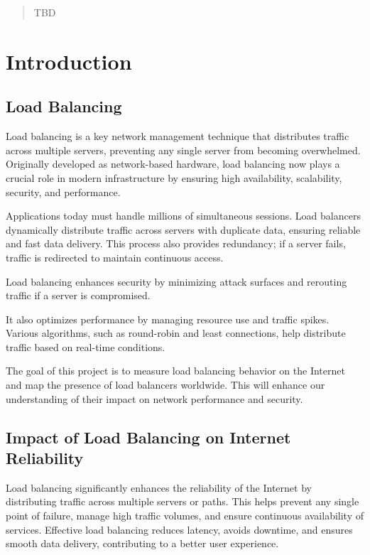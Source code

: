 \documentclass[12pt]{cwru_thesis}
\begin{document}
\printnomenclature

\begin{abstract}
  TBD
\end{abstract}

\mainmatter

\setcounter{secnumdepth}{2}

\chapter{Introduction} \label{chap:intro}
\section{Load Balancing} \label{sec:Loadsection}
Load balancing is a key network management technique that distributes traffic across multiple servers, preventing any single server from becoming overwhelmed. Originally developed as network-based hardware, load balancing now plays a crucial role in modern infrastructure by ensuring high availability, scalability, security, and performance.

Applications today must handle millions of simultaneous sessions. Load balancers dynamically distribute traffic across servers with duplicate data, ensuring reliable and fast data delivery. This process also provides redundancy; if a server fails, traffic is redirected to maintain continuous access.

Load balancing enhances security by minimizing attack surfaces and rerouting traffic if a server is compromised. 

It also optimizes performance by managing resource use and traffic spikes. Various algorithms, such as round-robin and least connections, help distribute traffic based on real-time conditions.


The goal of this project is to measure load balancing behavior on the Internet and map the presence of load balancers worldwide. This will enhance our understanding of their impact on network performance and security.


\section{Impact of Load Balancing on Internet Reliability}

Load balancing significantly enhances the reliability of the Internet by distributing traffic across multiple servers or paths. This helps prevent any single point of failure, manage high traffic volumes, and ensure continuous availability of services. Effective load balancing reduces latency, avoids downtime, and ensures smooth data delivery, contributing to a better user experience.
\end{document}
